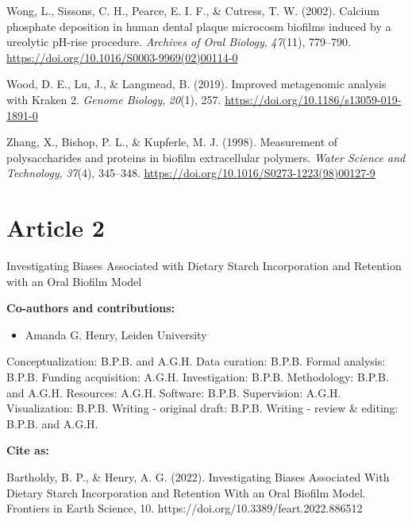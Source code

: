\documentclass[
  b5paper,
]{book}
\providecommand{\tightlist}{%
  \setlength{\itemsep}{0pt}\setlength{\parskip}{0pt}}
\newlength{\cslhangindent}
\newenvironment{CSLReferences}[2] %
 {\begin{list}{}{%
  \setlength{\itemindent}{0pt}
  \setlength{\leftmargin}{0pt}
  \setlength{\parsep}{0pt}
  \ifodd #1
   \setlength{\leftmargin}{\cslhangindent}
   \setlength{\itemindent}{-1\cslhangindent}
  \fi
  \setlength{\itemsep}{#2\baselineskip}}}
 {\end{list}}
\begin{document}
\begin{CSLReferences}{1}{0}
Wong, L., Sissons, C. H., Pearce, E. I. F., \& Cutress, T. W. (2002).
Calcium phosphate deposition in human dental plaque microcosm biofilms
induced by a ureolytic {pH-rise} procedure. \emph{Archives of Oral
Biology}, \emph{47}(11), 779--790.
\url{https://doi.org/10.1016/S0003-9969(02)00114-0}

Wood, D. E., Lu, J., \& Langmead, B. (2019). Improved metagenomic
analysis with {Kraken} 2. \emph{Genome Biology}, \emph{20}(1), 257.
\url{https://doi.org/10.1186/s13059-019-1891-0}

Zhang, X., Bishop, P. L., \& Kupferle, M. J. (1998). Measurement of
polysaccharides and proteins in biofilm extracellular polymers.
\emph{Water Science and Technology}, \emph{37}(4), 345--348.
\url{https://doi.org/10.1016/S0273-1223(98)00127-9}

\end{CSLReferences}


\chapter{Article 2}\label{article-2}

Investigating Biases Associated with Dietary Starch Incorporation and
Retention with an Oral Biofilm Model

\hfill\break

\footnotesize

\textbf{Co-authors and contributions:}

\begin{itemize}
\tightlist
\item
  Amanda G. Henry, Leiden University
\end{itemize}

Conceptualization: B.P.B. and A.G.H. Data curation: B.P.B. Formal
analysis: B.P.B. Funding acquisition: A.G.H. Investigation: B.P.B.
Methodology: B.P.B. and A.G.H. Resources: A.G.H. Software: B.P.B.
Supervision: A.G.H. Visualization: B.P.B. Writing - original draft:
B.P.B. Writing - review \& editing: B.P.B. and A.G.H.

\textbf{Cite as:}

Bartholdy, B. P., \& Henry, A. G. (2022). Investigating Biases
Associated With Dietary Starch Incorporation and Retention With an Oral
Biofilm Model. Frontiers in Earth Science, 10.
https://doi.org/10.3389/feart.2022.886512
\end{document}
